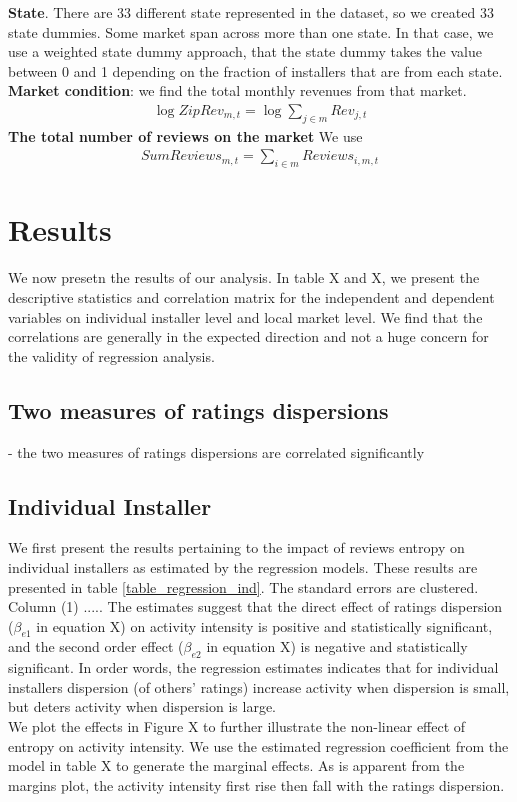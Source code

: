 \documentclass[msom,blindrev]{informs3}
\begin{document}
 \textbf{State}. There are 33 different state represented in the dataset, so we created 33 state dummies. Some market span across more than one state. In that case, we use a weighted state dummy approach, that the state dummy takes the value between 0 and 1 depending on the fraction of installers that are from each state. \\
  \textbf{Market condition}: 
we find the total monthly revenues from that market. 
\begin{align*}
\log ZipRev_{m,t}=\log \sum_{j\in m}Rev_{j,t}
\end{align*}
 \textbf{The total number of reviews on the market } We use 
\begin{align*}
SumReviews_{m,t}=\sum_{i\in m} Reviews_{i,m,t}
\end{align*}


\section{Results}
We now presetn the results of our analysis. In table X and X, we present the descriptive statistics and correlation matrix for the independent and dependent variables on individual installer level and local market level. We find that the correlations are generally in the expected direction and not a huge concern for the validity of regression analysis. 

\subsection{Two measures of ratings dispersions}
- the two measures of ratings dispersions are correlated significantly 
\subsection{Individual Installer}
We first present the results pertaining to the impact of reviews entropy on individual installers as estimated by the regression models. These results are presented in table \ref{table_regression_ind}.  The standard errors are clustered. Column (1) ..... The estimates suggest that the direct effect of ratings dispersion ($\beta_{e1}$ in equation X) on activity intensity is positive and statistically significant, and the second order effect ($\beta_{e2}$ in equation X) is negative and statistically significant. In order words, the regression estimates indicates that for individual installers dispersion (of others' ratings) increase activity when dispersion is small, but deters activity when dispersion is large.\\
We plot the effects in Figure X to further illustrate the non-linear effect of entropy on activity intensity. We use the estimated regression coefficient from the model in table X to generate the marginal effects. As is apparent from the margins plot, the activity intensity first rise then fall with the ratings dispersion. 
\end{document}
